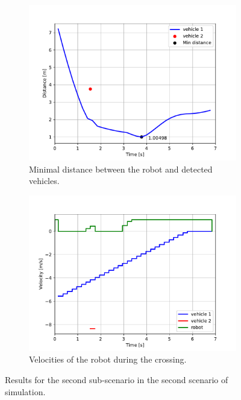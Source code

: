            \begin{figure}[H]
                \centering
                \begin{subfigure}{0.49\linewidth}
                    \centering
                    \includegraphics[trim={24 8 40 41}, clip, width=\linewidth]{images/simulations/scene2_2_dist.pdf}
                    \caption{Minimal distance between the robot and detected vehicles.}
                \end{subfigure}
                \begin{subfigure}{0.49\linewidth}
                    \centering
                    \includegraphics[trim={21 8 40 41}, clip, width=\linewidth]{images/simulations/scene2_2_vel.pdf}
                    \caption{Velocities of the robot during the crossing.}
                \end{subfigure}
                \caption{Results for the second sub-scenario in the second scenario of simulation.}
                \label{fig:scene2_2_graphs}
            \end{figure}
